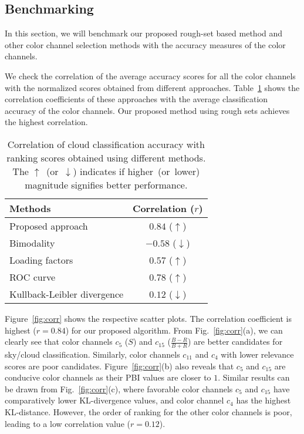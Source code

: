 \subsection{Benchmarking}
In this section, we will benchmark our proposed rough-set based method and other color channel selection methods with the accuracy measures of the color channels. 

We check the correlation of the average accuracy scores for all the color channels with the normalized scores obtained from different approaches. Table~\ref{tab:RS_corr_results} shows the correlation coefficients of these approaches with the average classification accuracy of the color channels. Our proposed method using rough sets achieves the highest correlation.

\begin{table}[htbp]
\normalsize
\centering
\begin{tabular}{lc}
\hline
\textbf{Methods} & \textbf{Correlation} ($r$) \\
\hline 
Proposed approach & $0.84$ ($\uparrow$)\\
Bimodality & $-0.58$ ($\downarrow$)\\
Loading factors & $0.57$ ($\uparrow$)\\
ROC curve & $0.78$ ($\uparrow$) \\
Kullback-Leibler divergence & $0.12$ ($\downarrow$) \\
\hline
\end{tabular}
\caption[Correlation of cloud classification accuracy with ranking scores obtained using different methods.]{Correlation of cloud classification accuracy with ranking scores obtained using different methods. The \mbox{$\uparrow$ (or $\downarrow$)} indicates if \mbox{higher (or lower)} magnitude signifies better performance.}
\label{tab:RS_corr_results}
\end{table}

Figure~\ref{fig:corr} shows the respective scatter plots. The correlation coefficient is highest ($r=0.84$) for our proposed algorithm. From Fig.~\ref{fig:corr}(a), we can clearly see that color channels $c_5$ ($S$) and $c_{15}$ ($\frac{B-R}{B+R}$) are better candidates for sky/cloud classification. Similarly, color channels $c_{11}$  and $c_4$ with lower relevance scores are poor candidates. Figure~\ref{fig:corr}(b) also reveals that $c_5$ and $c_{15}$ are conducive color channels as their PBI values are closer to $1$. Similar results can be drawn from Fig.~\ref{fig:corr}(c), where favorable color channels $c_5$ and $c_{15}$ have comparatively lower KL-divergence values, and color channel $c_4$ has the highest KL-distance. However, the order of ranking for the other color channels is poor, leading to a low correlation value ($r=0.12$). 

